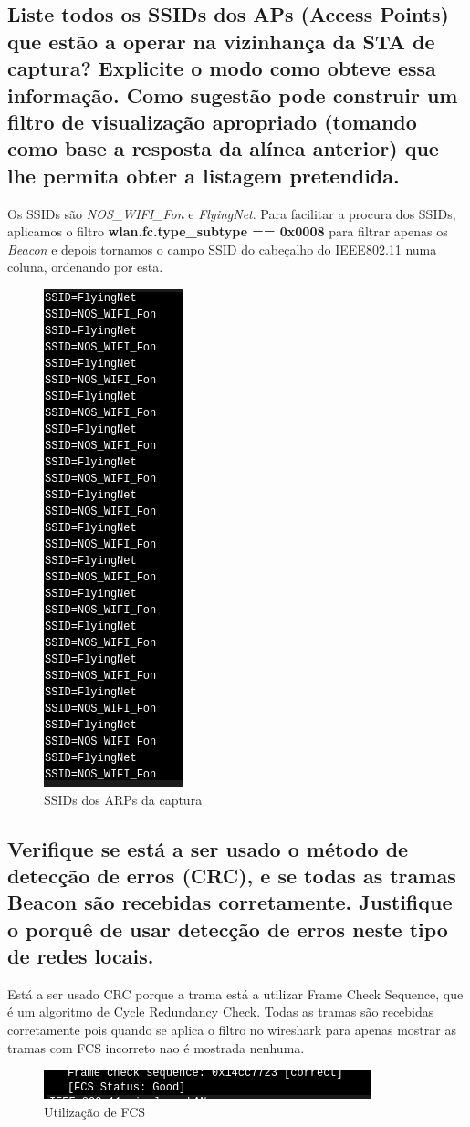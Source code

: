 \documentclass[a4paper]{article}
\begin{document}
\subsection{Liste todos os SSIDs dos APs (Access Points) que estão a operar na vizinhança da
STA de captura? Explicite o modo como obteve essa informação. Como sugestão
pode construir um filtro de visualização apropriado (tomando como base a
resposta da alínea anterior) que lhe permita obter a listagem pretendida.}
Os SSIDs são \textit{NOS\_WIFI\_Fon} e \textit{FlyingNet}.
Para facilitar a procura dos SSIDs, aplicamos o filtro \textbf{wlan.fc.type\_subtype == 0x0008} para filtrar apenas os \textit{Beacon} e depois tornamos o campo SSID do cabeçalho do IEEE802.11 numa coluna, ordenando por esta.
\begin{figure}[H]
\centering
\includegraphics[scale=0.50]{pics/p5.png}
\caption{SSIDs dos ARPs da captura}
\end{figure}

\subsection{Verifique se está a ser usado o método de detecção de erros (CRC), e se todas as
tramas Beacon são recebidas corretamente. Justifique o porquê de usar detecção
de erros neste tipo de redes locais.}
Está a ser usado CRC porque a trama está a utilizar Frame Check Sequence, que é um algoritmo de Cycle Redundancy Check. Todas as tramas são recebidas corretamente pois quando se aplica o filtro no wireshark para apenas mostrar as tramas com FCS incorreto nao é mostrada nenhuma.
\begin{figure}[H]
\centering
\includegraphics[scale=0.70]{pics/p6.png}
\caption{Utilização de FCS}
\end{figure}
\end{document}
